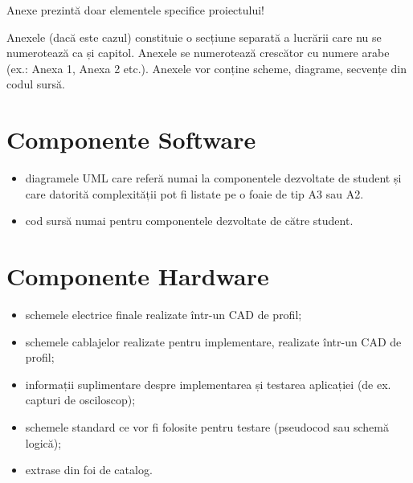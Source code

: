
Anexe prezintă doar elementele specifice proiectului!

Anexele (dacă este cazul) constituie o secțiune separată a lucrării care nu se numerotează ca și capitol. Anexele se numerotează crescător cu numere arabe (ex.: Anexa 1, Anexa 2 etc.). Anexele vor conține scheme, diagrame, secvențe din codul sursă.

\section{Componente Software}
\label{anexa1:comp_soft}

\begin{itemize}
    \item diagramele UML care referă numai la componentele dezvoltate de student și care datorită complexității pot fi listate pe o foaie de tip A3 sau A2.
    \item cod sursă numai pentru componentele dezvoltate de către student.
\end{itemize}

\newpage
\section{Componente Hardware}
\label{anexa2:comp_hard}

\begin{itemize}
    \item schemele electrice finale realizate într-un CAD de profil; 
    \item schemele cablajelor realizate pentru implementare, realizate într-un CAD de profil;
    \item informații suplimentare despre implementarea și testarea aplicației (de ex. capturi de osciloscop);
    \item schemele standard ce vor fi folosite pentru testare (pseudocod sau schemă logică);
    \item extrase din foi de catalog. 
\end{itemize}


